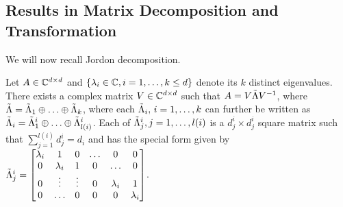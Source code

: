 \subsection{Results in Matrix Decomposition and Transformation}
We will now recall Jordon decomposition.
\begin{lemma}\label{jordon}
Let $A\in \mathbb{C}^{d \times d}$ and $\{\lambda_i\in \mathbb{C},i=1,\ldots,k\leq d \}$ denote its $k$ distinct eigenvalues.
There exists a complex matrix $V\in \mathbb{C}^{d \times d}$ such that $A=V\tilde{\Lambda} V^{-1}$, where
$\tilde{\Lambda}=\tilde{\Lambda}_1\oplus\ldots\oplus\tilde{\Lambda}_k$, where each $\tilde{\Lambda}_i,\,i=1,\ldots,k$ can further be written as $\tilde{\Lambda}_i= {\tilde{\Lambda}}^i_{1}\oplus \ldots \oplus {\tilde{\Lambda}}^i_{{l(i)}}$. Each of ${\tilde{\Lambda}}^i_{j},j=1,\ldots,l(i)$ is a $d^i_j\times d^i_j$ square matrix such that $\sum_{j=1}^{l(i)} d^i_j =d_i$ and has the special form given by
${\tilde{\Lambda}}^i_{j}=\begin{bmatrix} \lambda_i &1 &0 &\ldots &0 &0\\ 0 &\lambda_i &1 &0 &\ldots &0 \\ 0 &\vdots &\vdots &0 &\lambda_i &1 \\ 0 &\ldots &0 &0 &0 &\lambda_i \end{bmatrix}$.
\end{lemma}

